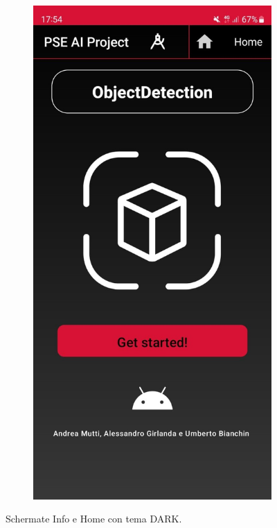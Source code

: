 \begin{figure}[ht]
\begin{subfigure}[b]{0.3\textwidth}
    \end{subfigure}
    \begin{subfigure}[b]{0.3\textwidth}
      \includegraphics[width=\textwidth, height=0.45\textheight]{Immagini/App/home_scuro.jpeg}
    \end{subfigure}
    \caption{Schermate Info e Home con tema DARK.}
    \label{fig:dark2}
\end{figure}

